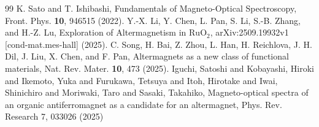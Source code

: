 \documentclass{article}
\begin{document}
\begin{thebibliography}{99}
 K. Sato and T. Ishibashi, Fundamentals of Magneto-Optical Spectroscopy, Front. Phys. \textbf{10}, 946515 (2022).
 Y.-X. Li, Y. Chen, L. Pan, S. Li, S.-B. Zhang, and H.-Z. Lu, Exploration of Altermagnetism in \(\mathrm{RuO}_2\), arXiv:2509.19932v1 [cond-mat.mes-hall] (2025).
 C. Song, H. Bai, Z. Zhou, L. Han, H. Reichlova, J. H. Dil, J. Liu, X. Chen, and F. Pan, Altermagnets as a new class of functional materials, Nat. Rev. Mater. \textbf{10}, 473 (2025).
 Iguchi, Satoshi and Kobayashi, Hiroki and Ikemoto, Yuka and Furukawa, Tetsuya and Itoh, Hirotake and Iwai, Shinichiro and Moriwaki, Taro and Sasaki, Takahiko, Magneto-optical spectra of an organic antiferromagnet as a candidate for an altermagnet, Phys. Rev. Research 7, 033026 (2025)


\end{thebibliography}
\end{document}
